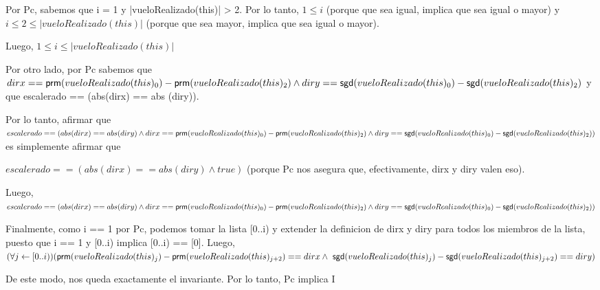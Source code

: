 \documentclass[a4paper]{article}
\begin{document}
        \bigskip
        Por Pc, sabemos que i = 1 y |vueloRealizado(this)| > 2. Por lo tanto, $1 \leq i$ (porque que sea igual, implica que sea igual o mayor) y $i \leq 2 \leq |vueloRealizado(this)|$ (porque que sea mayor, implica que sea igual o mayor).

        Luego, $1 \leq i \leq |vueloRealizado(this)|$

        \bigskip
        Por otro lado, por Pc sabemos que $dirx == \mathsf{prm}(vueloRealizado(this)_0) - \mathsf{prm}(vueloRealizado(this)_2) \\ \land diry == \mathsf{sgd}(vueloRealizado(this)_0) - \mathsf{sgd}(vueloRealizado(this)_2)$ y que escalerado == (abs(dirx) == abs (diry)).

        \bigskip
        Por lo tanto, afirmar que $escalerado == (abs(dirx)== abs (diry) \land \\ dirx == \mathsf{prm}(vueloRealizado(this)_0) - \mathsf{prm}(vueloRealizado(this)_2) \\ \land diry == \mathsf{sgd}(vueloRealizado(this)_0) - \mathsf{sgd}(vueloRealizado(this)_2))$ es simplemente afirmar que


        $ escalerado == (abs(dirx) == abs (diry) \land true)$ (porque Pc nos asegura que, efectivamente, dirx y diry valen eso).

        \bigskip
        Luego, $escalerado == (abs(dirx)== abs (diry) \land dirx == \mathsf{prm}(vueloRealizado(this)_0) - \mathsf{prm}(vueloRealizado(this)_2) \\ \land diry == \mathsf{sgd}(vueloRealizado(this)_0) - \mathsf{sgd}(vueloRealizado(this)_2))$

        \bigskip
        Finalmente, como i == 1 por Pc, podemos tomar la lista [0..i) y extender la definicion de dirx y diry para todos los miembros de la lista, puesto que i == 1 y [0..i) implica [0..i) == [0]. Luego, ${(\forall j \leftarrow [0..i))} \\ (\mathsf{prm}(vueloRealizado(this)_j) - \mathsf{prm}(vueloRealizado(this)_{j+2}) == dirx \\ \land \ \mathsf{sgd}(vueloRealizado(this)_j) - \mathsf{sgd}(vueloRealizado(this)_{j+2}) == diry)$

        \bigskip
        De este modo, nos queda exactamente el invariante. Por lo tanto, Pc implica I
\end{document}

